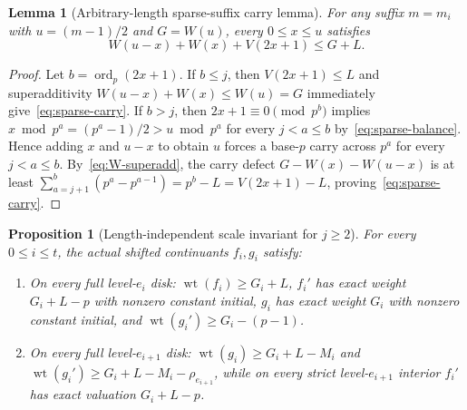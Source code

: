 \documentclass[11pt,reqno]{amsart}
\numberwithin{equation}{section}
\newtheorem{proposition}[theorem]{Proposition}
\newtheorem{lemma}[theorem]{Lemma}
\theoremstyle{definition}
\theoremstyle{remark}
\newcommand{\ord}{\operatorname{ord}}
\newcommand{\wt}{\operatorname{wt}}
\begin{document}
\begin{lemma}[Arbitrary-length sparse-suffix carry lemma]
\label{lem:sparse-carry}
For any suffix $m = m_i$ with $u=(m-1)/2$ and $G=W(u)$, every $0\le x\le u$ satisfies
\begin{equation}
\label{eq:sparse-carry}
W(u-x) + W(x) + V(2x+1) \le G + L.
\end{equation}
\end{lemma}

\begin{proof}
Let $b = \ord_p(2x+1)$. If $b\le j$, then $V(2x+1)\le L$ and superadditivity $W(u-x)+W(x)\le W(u)=G$ immediately give~\eqref{eq:sparse-carry}. If $b > j$, then $2x+1\equiv 0\pmod{p^b}$ implies $x\bmod p^a = (p^a-1)/2 > u\bmod p^a$ for every $j < a \le b$ by~\eqref{eq:sparse-balance}. Hence adding $x$ and $u-x$ to obtain $u$ forces a base-$p$ carry across $p^a$ for every $j<a\le b$. By~\eqref{eq:W-superadd}, the carry defect $G - W(x) - W(u-x)$ is at least $\sum_{a=j+1}^b (p^a - p^{a-1}) = p^b - L = V(2x+1) - L$, proving~\eqref{eq:sparse-carry}.
\end{proof}

\begin{proposition}[Length-independent scale invariant for $j\ge 2$]
\label{prop:sparse-inv}
For every $0\le i\le t$, the actual shifted continuants $f_i,g_i$ satisfy:
\begin{enumerate}[label=(\alph*),leftmargin=2em]
\item On every full level-$e_i$ disk: $\wt(f_i)\ge G_i+L$, $f_i'$ has exact weight $G_i+L-p$ with nonzero constant initial, $g_i$ has exact weight $G_i$ with nonzero constant initial, and $\wt(g_i')\ge G_i-(p-1)$.
\item On every full level-$e_{i+1}$ disk: $\wt(g_i)\ge G_i+L-M_i$ and $\wt(g_i')\ge G_i+L-M_i-\rho_{e_{i+1}}$, while on every \emph{strict} level-$e_{i+1}$ interior $f_i'$ has exact valuation $G_i+L-p$.
\end{enumerate}
\end{proposition}
\end{document}
